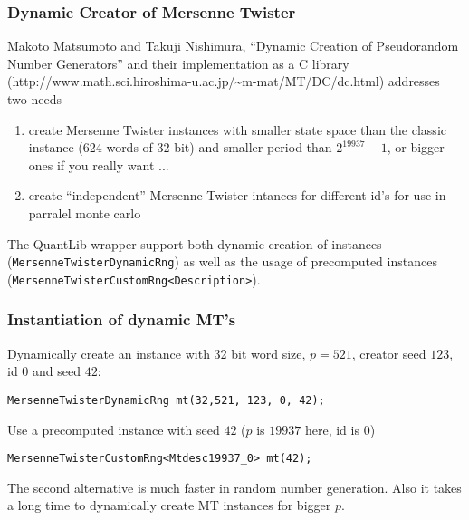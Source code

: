 \documentclass{beamer}
\begin{document}
\begin{frame}[fragile]
\frametitle{Dynamic Creator of Mersenne Twister}

Makoto Matsumoto and Takuji Nishimura, ``Dynamic Creation of Pseudorandom Number Generators'' and their implementation as a C library (http://www.math.sci.hiroshima-u.ac.jp/\~{}m-mat/MT/DC/dc.html) addresses two needs

\begin{enumerate}
\item create Mersenne Twister instances with smaller state space than the classic instance (624 words of 32 bit) and smaller period than $2^{19937}-1$, or bigger ones if you really want ...
\item create ``independent'' Mersenne Twister intances for different id's for use in parralel monte carlo
\end{enumerate}

The QuantLib wrapper support both dynamic creation of instances (\verb+MersenneTwisterDynamicRng+) as well as the usage of precomputed instances (\verb+MersenneTwisterCustomRng<Description>+).
\end{frame}

\begin{frame}[fragile]
\frametitle{Instantiation of dynamic MT's}
Dynamically create an instance with 32 bit word size, $p=521$, creator seed $123$, id $0$ and seed $42$:
\vspace{2mm}
\begin{verbatim}
MersenneTwisterDynamicRng mt(32,521, 123, 0, 42);
\end{verbatim}

Use a precomputed instance with seed $42$ ($p$ is $19937$ here, id is $0$)
\vspace{2mm}
\begin{verbatim}
MersenneTwisterCustomRng<Mtdesc19937_0> mt(42);
\end{verbatim}

The second alternative is much faster in random number generation. Also it takes a long time to dynamically create MT instances for bigger $p$.
\end{frame}
\end{document}
